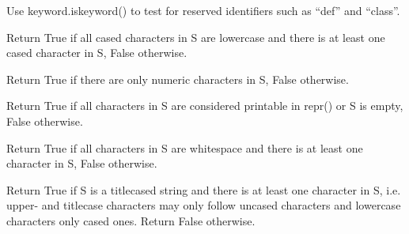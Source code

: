 \documentclass[letterpaper,10pt,english]{sphinxmanual}
\begin{document}
\begin{fulllineitems}
\begin{fulllineitems}
Use keyword.iskeyword() to test for reserved identifiers
such as ``def'' and ``class''.

\end{fulllineitems}


\begin{fulllineitems}
\label{api_reference:textblob_de.blob.Word.islower}
Return True if all cased characters in S are lowercase and there is
at least one cased character in S, False otherwise.

\end{fulllineitems}


\begin{fulllineitems}
\label{api_reference:textblob_de.blob.Word.isnumeric}
Return True if there are only numeric characters in S,
False otherwise.

\end{fulllineitems}


\begin{fulllineitems}
\label{api_reference:textblob_de.blob.Word.isprintable}
Return True if all characters in S are considered
printable in repr() or S is empty, False otherwise.

\end{fulllineitems}


\begin{fulllineitems}
\label{api_reference:textblob_de.blob.Word.isspace}
Return True if all characters in S are whitespace
and there is at least one character in S, False otherwise.

\end{fulllineitems}


\begin{fulllineitems}
\label{api_reference:textblob_de.blob.Word.istitle}
Return True if S is a titlecased string and there is at least one
character in S, i.e. upper- and titlecase characters may only
follow uncased characters and lowercase characters only cased ones.
Return False otherwise.


\end{fulllineitems}
\end{fulllineitems}
\end{document}
